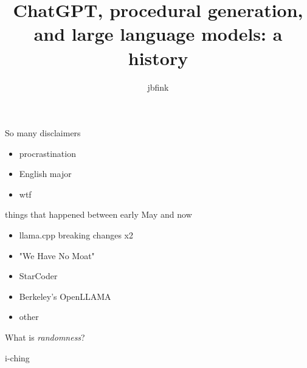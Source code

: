 \documentclass{beamer}
\title{ChatGPT, procedural generation, and large language models: a history}
\author{jbfink}
\begin{document}
\begin{frame}
    \maketitle
\end{frame}

\begin{frame}{So many disclaimers}
\begin{itemize}
	\item procrastination
	\pause
	\item English major
	\pause
	\item wtf
\end{itemize}
\end{frame}

\begin{frame}{things that happened between early May and now}
	\begin{itemize}
		\item llama.cpp breaking changes x2
		\pause
		\item "We Have No Moat"
		\pause
		\item StarCoder
		\pause
		\item Berkeley's OpenLLAMA
		\pause
		\item other
	\end{itemize}
\end{frame}
 
 \begin{frame}
 	What is \textit{randomness}?
 \end{frame}

  
\begin{frame}
	i-ching
\end{frame}

\begin{frame}
	
\end{frame}
\end{document}
